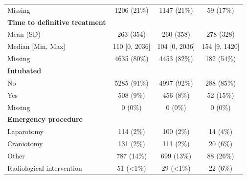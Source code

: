\documentclass[12pt, a4paper]{article}
\begin{document}
\begin{table}[p]
{\begin{tabular}{lccc}
            \hspace{3mm}Missing                           & 1206 (21\%)       & 1147 (21\%)       & 59 (17\%)        \\
            \textbf{Time to definitive treatment}         &                   &                   &                  \\
            \hspace{3mm}Mean (SD)                         & 263 (354)         & 260 (358)         & 278 (328)        \\
            \hspace{3mm}Median [Min, Max]                 & 110 [0, 2036]     & 104 [0, 2036]     & 154 [9, 1420]    \\
            \hspace{3mm}Missing                           & 4635 (80\%)       & 4453 (82\%)       & 182 (54\%)       \\
            \textbf{Intubated}                            &                   &                   &                  \\
            \hspace{3mm}No                                & 5285 (91\%)       & 4997 (92\%)       & 288 (85\%)       \\
            \hspace{3mm}Yes                               & 508 (9\%)         & 456 (8\%)         & 52 (15\%)        \\
            \hspace{3mm}Missing                           & 0 (0\%)           & 0 (0\%)           & 0 (0\%)          \\
            \textbf{Emergency procedure}                  &                   &                   &                  \\
            \hspace{3mm}Laparotomy                        & 114 (2\%)         & 100 (2\%)         & 14 (4\%)         \\
            \hspace{3mm}Craniotomy                        & 131 (2\%)         & 111 (2\%)         & 20 (6\%)         \\
            \hspace{3mm}Other                             & 787 (14\%)        & 699 (13\%)        & 88 (26\%)        \\
            \hspace{3mm}Radiological intervention         & 51 (\textless1\%) & 29 (\textless1\%) & 22 (6\%)         \\

\end{tabular}}
\end{table}
\end{document}
